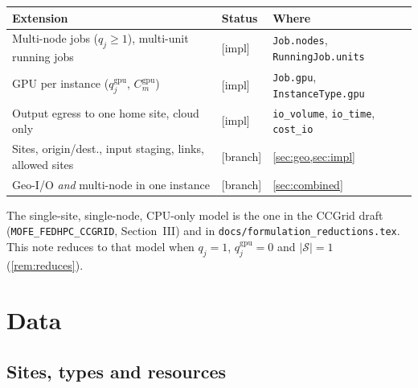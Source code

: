 \documentclass[11pt,a4paper]{article}
\newcommand{\Sites}{\mathcal{S}}
\newcommand{\code}[1]{\texttt{#1}}
\newcommand{\status}[1]{\textsf{\small[#1]}}
\begin{document}
\begin{center}
\small
\begin{tabular}{@{}lll@{}}
\toprule
Extension & Status & Where \\
\midrule
Multi-node jobs ($q_j\ge1$), multi-unit running jobs & \status{impl} &
  \code{Job.nodes}, \code{RunningJob.units} \\
GPU per instance ($q^{\mathrm{gpu}}_j$, $C^{\mathrm{gpu}}_m$) & \status{impl} &
  \code{Job.gpu}, \code{InstanceType.gpu} \\
Output egress to one home site, cloud only & \status{impl} &
  \code{io\_volume}, \code{io\_time}, \code{cost\_io} \\
Sites, origin/dest., input staging, links, allowed sites & \status{branch} &
  \cref{sec:geo,sec:impl} \\
Geo-I/O \emph{and} multi-node in one instance & \status{branch} &
  \cref{sec:combined} \\
\bottomrule
\end{tabular}
\end{center}

\noindent\sloppy The single-site, single-node, CPU-only model is the one in the
CCGrid draft
(\code{MOFE\_FEDHPC\_CCGRID}, Section~III) and in
\code{docs/formulation\_reductions.tex}. This note reduces to that model when
$q_j=1$, $q^{\mathrm{gpu}}_j=0$ and $|\Sites|=1$ (\cref{rem:reduces}).

\section{Data}\label{sec:data}

\subsection{Sites, types and resources}
\end{document}
